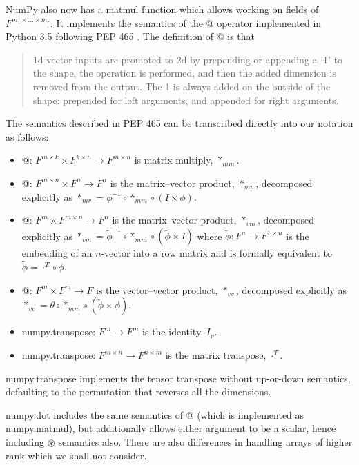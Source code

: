 NumPy also now has a matmul function which allows working on fields
of $F^{m_{1}\times...\times m_{r}}$. It implements the semantics
of the @ operator implemented in Python 3.5 following PEP 465 \cite{Smith2014}.
The definition of @ is that
\begin{quote}
1d vector inputs are promoted to 2d by prepending or appending a '1'
to the shape, the operation is performed, and then the added dimension
is removed from the output. The 1 is always added on the \textquotedbl{}outside\textquotedbl{}
of the shape: prepended for left arguments, and appended for right
arguments.
\end{quote}
The semantics described in PEP 465 can be transcribed directly into
our notation as follows:
\begin{itemize}
\item @: $F^{m\times k}\times F^{k\times n}\rightarrow F^{m\times n}$ is
matrix multiply, $*_{mm}$.
\item @: $F^{m\times n}\times F^{n}\rightarrow F^{n}$ is the matrix–vector
product, $*_{mv}$, decomposed explicitly as $*_{mv}=\phi^{-1}\circ*_{mm}\circ\left(I\times\phi\right)$.
\item @: $F^{m}\times F^{m\times n}\rightarrow F^{n}$ is the matrix–vector
product, $*_{vm}$, decomposed explicitly as $*_{vm}=\tilde{\phi}^{-1}\circ*_{mm}\circ\left(\tilde{\phi}\times I\right)$
where $\tilde{\phi}:F^{n}\rightarrow F^{1\times n}$ is the embedding
of an $n$-vector into a row matrix and is formally equivalent to
$\tilde{\phi}=\cdot^{T}\circ\phi$.
\item @: $F^{m}\times F^{m}\rightarrow F$ is the vector–vector product,
$*_{vv}$, decomposed explicitly as $*_{vv}=\theta\circ*_{mm}\circ\left(\tilde{\phi}\times\phi\right)$.
\item numpy.transpose: $F^{m}\rightarrow F^{m}$ is the identity, $I_{v}$.
\item numpy.transpose: $F^{m\times n}\rightarrow F^{n\times m}$ is the
matrix transpose, $\cdot^{T}$.
\end{itemize}
numpy.transpose implements the tensor transpose without up-or-down
semantics, defaulting to the permutation that reverses all the dimensions.

numpy.dot includes the same semantics of @ (which is implemented as
numpy.matmul), but additionally allows either argument to be a scalar,
hence including $\circledast$ semantics also. There are also differences
in handling arrays of higher rank which we shall not consider.

